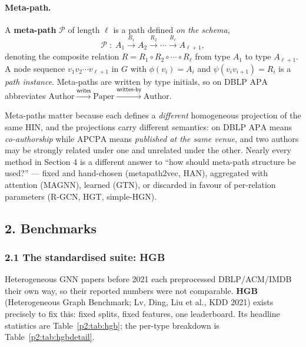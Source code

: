 \paragraph{Meta-path.}
A \textbf{meta-path} $\mathcal{P}$ of length $\ell$ is a path defined \emph{on the schema},
\[
  \mathcal{P}\;:\;A_1\xrightarrow{R_1}A_2\xrightarrow{R_2}\cdots\xrightarrow{R_\ell}A_{\ell+1},
\]
denoting the composite relation $R=R_1\circ R_2\circ\cdots\circ R_\ell$ from type $A_1$ to type
$A_{\ell+1}$. A node sequence $v_1v_2\cdots v_{\ell+1}$ in $G$ with $\phi(v_i)=A_i$ and
$\psi(v_iv_{i+1})=R_i$ is a \emph{path instance}. Meta-paths are written by type initials, so on
DBLP $\mathrm{APA}$ abbreviates
$\text{Author}\xrightarrow{\mathsf{writes}}\text{Paper}\xrightarrow{\mathsf{written\text{-}by}}\text{Author}$.

Meta-paths matter because each defines a \emph{different} homogeneous projection of the same HIN,
and the projections carry different semantics: on DBLP $\mathrm{APA}$ means \emph{co-authorship}
while $\mathrm{APCPA}$ means \emph{published at the same venue}, and two authors may be strongly
related under one and unrelated under the other. Nearly every method in
Section 4 is a different answer to ``how should meta-path structure be
used?'' --- fixed and hand-chosen (metapath2vec, HAN), aggregated with attention (MAGNN), learned
(GTN), or discarded in favour of per-relation parameters (R-GCN, HGT, simple-HGN).

\subsection*{2. Benchmarks}

\subsubsection*{2.1 The standardised suite: HGB}

Heterogeneous GNN papers before 2021 each preprocessed DBLP/ACM/IMDB their own way, so their
reported numbers were not comparable. \textbf{HGB} (Heterogeneous Graph Benchmark; Lv, Ding, Liu
et al., KDD 2021) exists precisely to fix this: fixed splits, fixed features, one leaderboard.
Its headline statistics are Table~\ref{p2:tab:hgb}; the per-type breakdown is
Table~\ref{p2:tab:hgbdetail}.


